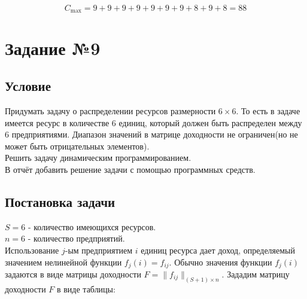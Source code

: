 \documentclass{article}
\begin{document}
\[ C_{\text{max}} = 9 + 9 + 9 + 9 + 9 + 9 + 9 + 8 + 9 + 8 = 88 \]

\section{Задание №9}

\subsection{Условие}

Придумать задачу о распределении ресурсов размерности $6 \times 6$.
То есть в задаче имеется ресурс в количестве 6 единиц, который должен быть распределен между 6 предприятиями.
Диапазон значений в матрице доходности не ограничен(но не может быть отрицательных элементов).\\
Решить задачу динамическим программированием.\\
В отчёт добавить решение задачи с помощью программных средств.

\subsection{Постановка задачи}

$S = 6$ - количество имеющихся ресурсов.\\
$n = 6$ - количество предприятий.\\
Использование $j$-ым предприятием $i$ единиц
ресурса дает доход, определяемый значением нелинейной функции $f_j(i) = f_{ij}$. Обычно значения функции $f_j(i)$ задаются в виде матрицы доходности $F = \|f_{ij}\|_{(S+1) \times n}$.
Зададим матрицу доходности $F$ в виде таблицы:
\end{document}
